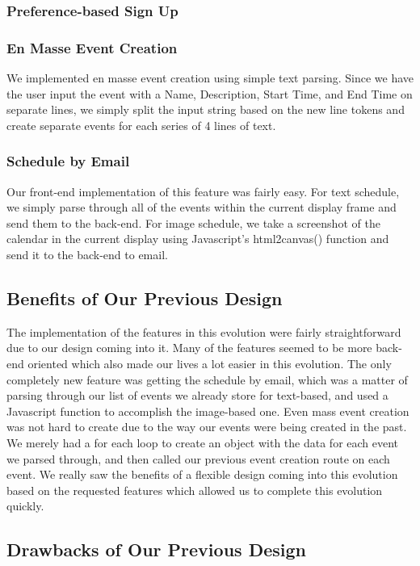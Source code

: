 \documentclass[11pt]{article}   %
\begin{document}
\subsubsection{Preference-based Sign Up}

\subsubsection{En Masse Event Creation}

We implemented en masse event creation using simple text parsing. Since we have the user input the event with a Name, Description, Start Time, and End Time on separate lines, we simply split the input string based on the new line tokens and create separate events for each series of 4 lines of text.

\subsubsection{Schedule by Email}
Our front-end implementation of this feature was fairly easy. For text schedule, we simply parse through all of the events within the current display frame and send them to the back-end. For image schedule, we take a screenshot of the calendar in the current display using Javascript's html2canvas() function and send it to the back-end to email.

\subsection{Benefits of Our Previous Design}

The implementation of the features in this evolution were fairly straightforward due to our design coming into it. Many of the features seemed to be more back-end oriented which also made our lives a lot easier in this evolution. The only completely new feature was getting the schedule by email, which was a matter of parsing through our list of events we already store for text-based, and used a Javascript function to accomplish the image-based one. Even mass event creation was not hard to create due to the way our events were being created in the past. We merely had a for each loop to create an object with the data for each event we parsed through, and then called our previous event creation route on each event. We really saw the benefits of a flexible design coming into this evolution based on the requested features which allowed us to complete this evolution quickly.

\subsection{Drawbacks of Our Previous Design}
\end{document}
